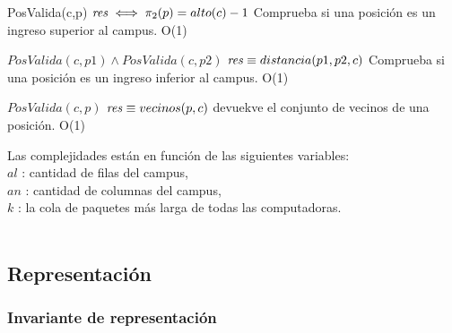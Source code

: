  {PosValida(c,p)}
 {$\text{\textit{res}} \iff \pi_2(p)=alto(c)-1 $}
 {Comprueba si una posición es un ingreso superior al campus.}
 {O(1)}
 {}

 {$PosValida(c,p1) \land PosValida(c,p2)$}
 {$\text{\textit{res}} \equiv distancia (p1, p2, c) $}
 {Comprueba si una posición es un ingreso inferior al campus.}
 {O(1)}
 {}
 
 {$PosValida(c,p)$}
 {$\text{\textit{res}} \equiv vecinos (p, c) $}
 {devuekve el conjunto de vecinos de una posición.}
 {O(1)}
 {}
 
Las complejidades están en función de las siguientes variables:\\
$al$ : cantidad de filas del campus, \\
$an$ : cantidad de columnas del campus, \\
$k$ : la cola de paquetes más larga de todas las computadoras. 
\\ \\



\subsection{Representación}


\subsubsection*{Invariante de representación}

